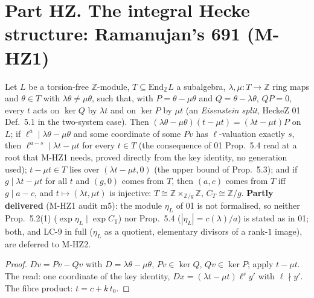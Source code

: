 
\chapter{Part HZ. The integral Hecke structure: Ramanujan's 691 (M-HZ1)}

\begin{lemma}[LC-9 at $r=1$, partly: the congruence module of one rational Eisenstein line]\label{inf:heckez-cong}
  \leanok
  Let $L$ be a torsion-free $\mathbb Z$-module, $T\subseteq\mathrm{End}_{\mathbb Z}L$ a subalgebra, $\lambda,\mu:T\to\mathbb Z$ ring maps
  and $\theta\in T$ with $\lambda\theta\ne\mu\theta$, such that, with $P=\theta-\mu\theta$ and $Q=\theta-\lambda\theta$, $QP=0$, every $t$ acts
  on $\ker Q$ by $\lambda t$ and on $\ker P$ by $\mu t$ (an \emph{Eisenstein split}, HeckeZ 01 Def.~5.1 in the two-system case).
  Then $(\lambda\theta-\mu\theta)(t-\mu t)=(\lambda t-\mu t)P$ on $L$; if $\ell^a\mid\lambda\theta-\mu\theta$ and some coordinate of some $Pv$
  has $\ell$-valuation exactly $s$, then $\ell^{a-s}\mid\lambda t-\mu t$ for every $t\in T$ (the consequence of 01 Prop.~5.4 read at a
  root that M-HZ1 needs, proved directly from the key identity, no generation used); $t-\mu t\in T$ lies over $(\lambda t-\mu t,0)$ (the upper bound of Prop.~5.3); and if
  $g\mid\lambda t-\mu t$ for all $t$ and $(g,0)$ comes from $T$, then $(a,c)$ comes from $T$ iff $g\mid a-c$, and $t\mapsto(\lambda t,\mu t)$
  is injective: $T\cong\mathbb Z\times_{\mathbb Z/g}\mathbb Z$, $C_T\cong\mathbb Z/g$.
  \textbf{Partly delivered} (M-HZ1 audit m5): the module $\eta_L$ of 01 is not formalised, so neither Prop.~5.2(1)
  ($\exp\eta_L\mid\exp C_{\mathbb T}$) nor Prop.~5.4 ($|\eta_L|=c(\lambda)/a$) is stated as in 01; both, and LC-9 in full
  ($\eta_L$ as a quotient, elementary divisors of a rank-$1$ image), are deferred to M-HZ2.
\end{lemma}
\begin{proof}
  \leanok
  $Dv=Pv-Qv$ with $D=\lambda\theta-\mu\theta$, $Pv\in\ker Q$, $Qv\in\ker P$; apply $t-\mu t$. The read: one coordinate of the key
  identity, $D x=(\lambda t-\mu t)\ell^s y'$ with $\ell\nmid y'$. The fibre product: $t=c+k\,t_0$.
\end{proof}


